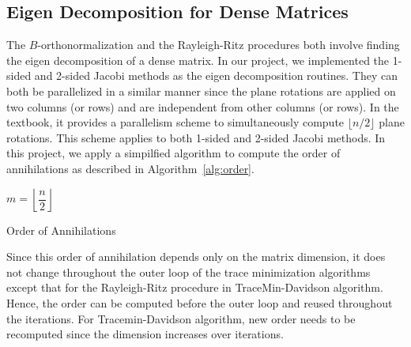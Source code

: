 \label{sec:implementation}
\subsection{Eigen Decomposition for Dense Matrices}
The $B$-orthonormalization and the Rayleigh-Ritz procedures both involve finding the eigen decomposition of a
dense matrix. In our project, we implemented the 1-sided and 2-sided Jacobi methods as the eigen decomposition
routines. They can both be parallelized in a similar manner since the plane rotations are applied on two columns
(or rows) and are independent from other columns (or rows). In the textbook\cite{gallopoulos}, it provides a
parallelism scheme to simultaneously compute $\lfloor n / 2\rfloor$ plane rotations. This scheme applies to both
1-sided and 2-sided Jacobi methods. In this project, we apply a simpilfied algorithm to compute the order of
annihilations as described in Algorithm~\ref{alg:order}.
\begin{algorithm}[!h]
	\SetArgSty{}
	$m = \left\lfloor\dfrac{n}{2}\right\rfloor$\;
	\caption{Order of Annihilations}\label{alg:order}
\end{algorithm}
Since this order of annihilation depends only on the matrix dimension, it does not change throughout the outer
loop of the trace minimization algorithms except that for the Rayleigh-Ritz procedure in TraceMin-Davidson algorithm.
Hence, the order can be computed before the outer loop and reused throughout the iterations. For Tracemin-Davidson
algorithm, new order needs to be recomputed since the dimension increases over iterations.


